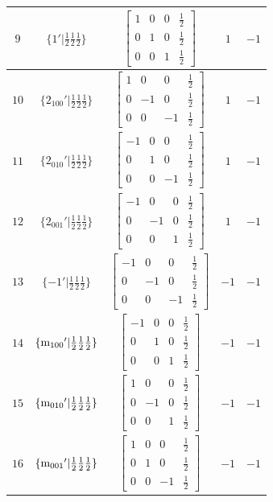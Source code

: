 \documentclass[fleqn,8pt]{jsarticle}
\begin{document}
\begin{longtable}{ccccc}
$ 9 $ & $ \{1{}'|\frac{1}{2} \frac{1}{2} \frac{1}{2}\} $ & $ \begin{bmatrix} 1 & 0 & 0 & \frac{1}{2} \\ 0 & 1 & 0 & \frac{1}{2} \\ 0 & 0 & 1 & \frac{1}{2} \end{bmatrix} $ & $ 1 $ & $ -1 $ \\ \hline
$ 10 $ & $ \{2{}_{100}{}'|\frac{1}{2} \frac{1}{2} \frac{1}{2}\} $ & $ \begin{bmatrix} 1 & 0 & 0 & \frac{1}{2} \\ 0 & -1 & 0 & \frac{1}{2} \\ 0 & 0 & -1 & \frac{1}{2} \end{bmatrix} $ & $ 1 $ & $ -1 $ \\ \hline
$ 11 $ & $ \{2{}_{010}{}'|\frac{1}{2} \frac{1}{2} \frac{1}{2}\} $ & $ \begin{bmatrix} -1 & 0 & 0 & \frac{1}{2} \\ 0 & 1 & 0 & \frac{1}{2} \\ 0 & 0 & -1 & \frac{1}{2} \end{bmatrix} $ & $ 1 $ & $ -1 $ \\ \hline
$ 12 $ & $ \{2{}_{001}{}'|\frac{1}{2} \frac{1}{2} \frac{1}{2}\} $ & $ \begin{bmatrix} -1 & 0 & 0 & \frac{1}{2} \\ 0 & -1 & 0 & \frac{1}{2} \\ 0 & 0 & 1 & \frac{1}{2} \end{bmatrix} $ & $ 1 $ & $ -1 $ \\ \hline
$ 13 $ & $ \{-1{}'|\frac{1}{2} \frac{1}{2} \frac{1}{2}\} $ & $ \begin{bmatrix} -1 & 0 & 0 & \frac{1}{2} \\ 0 & -1 & 0 & \frac{1}{2} \\ 0 & 0 & -1 & \frac{1}{2} \end{bmatrix} $ & $ -1 $ & $ -1 $ \\ \hline
$ 14 $ & $ \{{\rm m}_{100}{}'|\frac{1}{2} \frac{1}{2} \frac{1}{2}\} $ & $ \begin{bmatrix} -1 & 0 & 0 & \frac{1}{2} \\ 0 & 1 & 0 & \frac{1}{2} \\ 0 & 0 & 1 & \frac{1}{2} \end{bmatrix} $ & $ -1 $ & $ -1 $ \\ \hline
$ 15 $ & $ \{{\rm m}_{010}{}'|\frac{1}{2} \frac{1}{2} \frac{1}{2}\} $ & $ \begin{bmatrix} 1 & 0 & 0 & \frac{1}{2} \\ 0 & -1 & 0 & \frac{1}{2} \\ 0 & 0 & 1 & \frac{1}{2} \end{bmatrix} $ & $ -1 $ & $ -1 $ \\ \hline
$ 16 $ & $ \{{\rm m}_{001}{}'|\frac{1}{2} \frac{1}{2} \frac{1}{2}\} $ & $ \begin{bmatrix} 1 & 0 & 0 & \frac{1}{2} \\ 0 & 1 & 0 & \frac{1}{2} \\ 0 & 0 & -1 & \frac{1}{2} \end{bmatrix} $ & $ -1 $ & $ -1 $ \\
\end{longtable}
\end{document}
